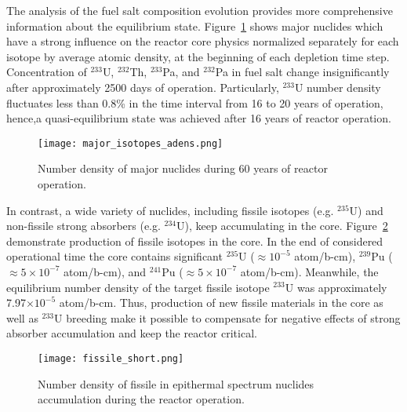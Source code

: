 The analysis of the fuel salt composition evolution provides more comprehensive information about the equilibrium state. Figure~\ref{fig:adens_eq} shows major nuclides which have a strong influence on the reactor core physics normalized separately for each isotope by average atomic density, at the beginning of each depletion time step. Concentration of $^{233}$U, $^{232}$Th, $^{233}$Pa, and $^{232}$Pa in fuel salt change insignificantly after approximately 2500 days of operation. Particularly, $^{233}$U number density fluctuates less than 0.8\% in the time interval from 16 to 20 years of operation, hence,a quasi-equilibrium state was achieved after 16 years of reactor operation.
\begin{figure}[ht!] %
  \centering
  \texttt{[image: major\_isotopes\_adens.png]}
  \caption{Number density of major nuclides during 60 years of reactor operation.}
  \label{fig:adens_eq}
\end{figure}
In contrast, a wide variety of nuclides, including fissile isotopes (e.g. $^{235}$U) and non-fissile strong absorbers (e.g. $^{234}$U), keep accumulating in the core. Figure~\ref{fig:fissile_short} demonstrate production of fissile isotopes in the core. In the end of considered operational time the core contains significant $^{235}$U ($\approx10^{-5}$ atom/b-cm), $^{239}$Pu ($\approx5\times10^{-7}$ atom/b-cm), and $^{241}$Pu ($\approx 5\times10^{-7}$ atom/b-cm). Meanwhile, the equilibrium number density of the target fissile isotope $^{233}$U was approximately 7.97$\times10^{-5}$ atom/b-cm. Thus, production of new fissile materials in the core as well as $^{233}$U breeding make it possible to compensate for negative effects of strong absorber accumulation and keep the reactor critical.
\begin{figure}[htp!] %
  \centering
  \texttt{[image: fissile\_short.png]}
  \caption{Number density of fissile in epithermal spectrum nuclides accumulation during the reactor operation.}
  \label{fig:fissile_short}
\end{figure}

